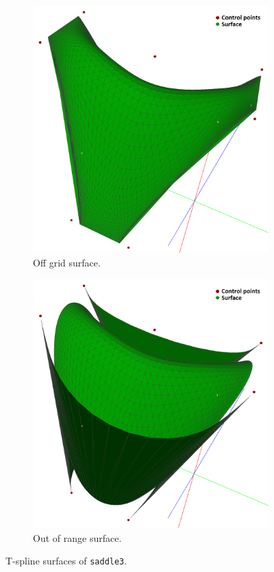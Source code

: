\documentclass{article}
\begin{document}
\begin{figure}[H]
\begin{subfigure}[b]{0.32\textwidth}
\includegraphics[width=\textwidth]{saddle3b}
\caption{Off grid surface.}
\label{saddle3b}
\end{subfigure}
\begin{subfigure}[b]{0.32\textwidth}
\includegraphics[width=\textwidth]{saddle3c}
\caption{Out of range surface.}
\label{saddle3c}
\end{subfigure}
\caption{T-spline surfaces of \texttt{saddle3}.}
\label{saddle3}
\end{figure}
\end{document}
